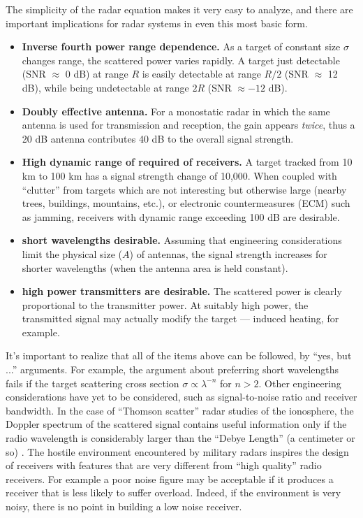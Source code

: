 The simplicity of the radar equation makes it very easy to analyze,
and there are important implications for radar systems in even this
most basic form.

\begin{itemize}
\item \textbf{Inverse fourth power range dependence.}  As a target of
constant size $\sigma$ changes range, the scattered power varies
rapidly.  A target just detectable (SNR $\approx$ 0 dB) at range $R$ is
easily detectable at range $R/2$ (SNR $\approx$ 12 dB), while being
undetectable at range $2R$ (SNR $\approx -12$ dB).
\item \textbf{Doubly effective antenna.}  For a monostatic radar in
which the same antenna is used for transmission and reception, the
gain appears \textit{twice}, thus a 20 dB antenna contributes 40 dB to
the overall signal strength.
\item \textbf{High dynamic range of required of receivers.}  A target
tracked from 10 km to 100 km has a signal strength change of 10,000.
When coupled with ``clutter'' from targets which are not interesting
but otherwise large (nearby trees, buildings, mountains, etc.), or
electronic countermeasures (ECM) such as jamming, receivers with
dynamic range exceeding 100 dB are desirable. 
\item \textbf{short wavelengths desirable.}  Assuming that engineering
considerations limit the physical size ($A$) of antennas, the signal
strength increases for shorter wavelengths (when the antenna area is
held constant).
\item \textbf{high power transmitters are desirable.}  The scattered
power is clearly proportional to the transmitter power.  At suitably
high power, the transmitted signal may actually modify the target ---
induced heating, for example.
\end{itemize}

It's important to realize that all of the items above can be followed,
by ``yes, but ...'' arguments.  For example, the argument about
preferring short wavelengths fails if the target scattering cross
section $\sigma \propto \lambda^{-n}$ for $n > 2$.  Other engineering
considerations have yet to be considered, such as signal-to-noise
ratio and receiver bandwidth.  In the case of ``Thomson scatter''
radar studies of the ionosphere, the Doppler spectrum of the scattered
signal contains useful information only if the radio wavelength is
considerably larger than the ``Debye Length'' (a centimeter or so)
\cite{nicholson-1983}.  The hostile environment 
encountered by military radars inspires the design of receivers with
features that are very different from ``high quality'' radio receivers.  For example
a poor noise figure may be acceptable if it produces a receiver that is less
likely to suffer overload.  Indeed, if the environment is very noisy, there is 
no point in building a low noise receiver.

